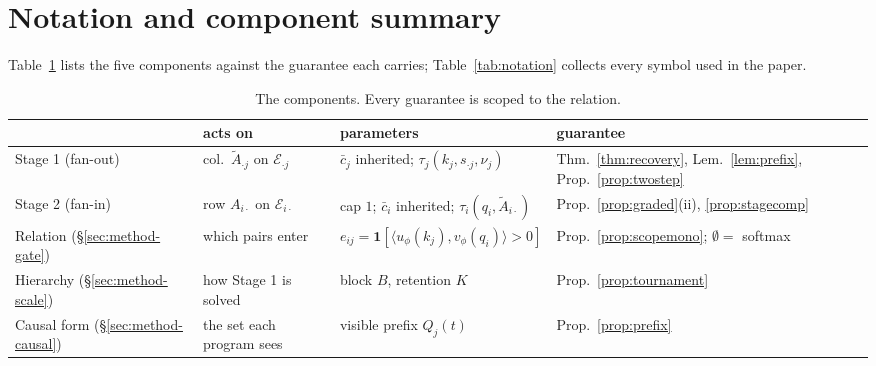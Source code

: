 \documentclass{article}
\begin{document}
\appendix


\section{Notation and component summary}
\label{app:notation}

Table~\ref{tab:stages} lists the five components against the guarantee each carries;
Table~\ref{tab:notation} collects every symbol used in the paper.

\begin{table}[h]
\centering
\caption{The components. Every guarantee is scoped to the relation.}
\label{tab:stages}
\footnotesize
\setlength{\tabcolsep}{3.5pt}\scriptsize
\begin{tabular}{@{}llll@{}}
\toprule
& \textbf{acts on} & \textbf{parameters} & \textbf{guarantee} \\
\midrule
Stage 1 (fan-out) & col.\ $\tilde A_{\cdot j}$ on $\mathcal{E}_{\cdot j}$ & $\bar c_j$ inherited; $\tau_j(k_j,s_{\cdot j},\nu_j)$ & Thm.~\ref{thm:recovery}, Lem.~\ref{lem:prefix}, Prop.~\ref{prop:twostep} \\
Stage 2 (fan-in)  & row $A_{i\cdot}$ on $\mathcal{E}_{i\cdot}$ & cap $1$; $\bar c_i$ inherited; $\tau_i(q_i,\tilde A_{i\cdot})$ & Prop.~\ref{prop:graded}(ii), \ref{prop:stagecomp} \\
Relation (\S\ref{sec:method-gate}) & which pairs enter & $e_{ij}=\mathbf{1}[\langle u_\phi(k_j),v_\phi(q_i)\rangle>0]$ & Prop.~\ref{prop:scopemono}; $\emptyset=$ softmax \\
Hierarchy (\S\ref{sec:method-scale}) & how Stage 1 is solved & block $B$, retention $K$ & Prop.~\ref{prop:tournament} \\
Causal form (\S\ref{sec:method-causal}) & the set each program sees & visible prefix $Q_j(t)$ & Prop.~\ref{prop:prefix} \\
\bottomrule
\end{tabular}
\end{table}
\end{document}
